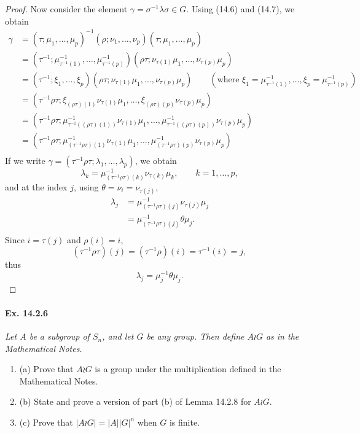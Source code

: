 \documentclass[11pt,a4paper]{article}
\newcommand{\be} {\begin{enumerate}}
\newcommand{\ee} {\end{enumerate}}
\begin{document}
\begin{proof}
Now consider the element $\gamma = \sigma^{-1} \lambda \sigma \in G$. Using (14.6) and (14.7), we obtain
\begin{align*}
\gamma &=  (\tau; \mu_1,\ldots,\mu_p)^{-1} (\rho; \nu_1,\ldots,\nu_p)(\tau; \mu_1,\ldots,\mu_p)\\
&=(\tau^{-1};\mu^{-1}_{\tau^{-1}(1)},\ldots,\mu^{-1}_{\tau^{-1}(p) })(\rho \tau; \nu_{\tau(1)}\mu_1,\ldots,\nu_{\tau(p)} \mu_p)\\
&=(\tau^{-1};\xi_1,\ldots,\xi_p)(\rho \tau; \nu_{\tau(1)}\mu_1,\ldots,\nu_{\tau(p)} \mu_p)\qquad (\text{where }\xi_1 =\mu^{-1}_{\tau^{-1}(1)},\ldots, \xi_p =\mu^{-1}_{\tau^{-1}(p)}) \\
&= (\tau^{-1} \rho \tau; \xi_{(\rho \tau)(1)}\nu_{\tau(1)}\mu_1,\ldots,\xi_{(\rho \tau)(p)}\nu_{\tau(p)}\mu_p)\\
&= (\tau^{-1} \rho \tau; \mu^{-1}_{\tau^{-1}((\rho \tau)(1))}\nu_{\tau(1)}\mu_1,\ldots,\mu^{-1}_{\tau^{-1}((\rho \tau)(p))}\nu_{\tau(p)}\mu_p)\\
&=(\tau^{-1} \rho \tau; \mu^{-1}_{(\tau^{-1}\rho \tau)(1)}\nu_{\tau(1)}\mu_1,\ldots,\mu^{-1}_{(\tau^{-1}\rho \tau)(p)}\nu_{\tau(p)}\mu_p)\\
\end{align*}
If we write $\gamma = (\tau^{-1} \rho \tau; \lambda_1,\ldots,\lambda_p)$, we obtain
$$\lambda_k = \mu^{-1}_{(\tau^{-1}\rho \tau)(k)}\nu_{\tau(k)}\mu_k,\qquad k = 1,\ldots,p,$$
and at the index $j$, using $\theta = \nu_i = \nu_{\tau(j)}$,
\begin{align*}
\lambda_j &= \mu^{-1}_{(\tau^{-1}\rho \tau)(j)}\nu_{\tau(j)}\mu_j\\
&=\mu^{-1}_{(\tau^{-1}\rho \tau)(j)}\theta\mu_j.\\
\end{align*}
Since $i = \tau(j)$ and $\rho(i) = i$, 
$$(\tau^{-1} \rho\tau)(j) = (\tau^{-1} \rho)(i) = \tau^{-1} (i) = j,$$
thus
$$\lambda_j = \mu_j^{-1} \theta \mu_j.$$
\end{proof}



\paragraph{Ex. 14.2.6}
{\it Let $A$ be a subgroup of $S_n$, and let $G$ be any group. Then define $A \wr G$ as in the Mathematical Notes.
\be
\item[(a)] Prove that $A \wr G$ is a group under the multiplication defined in the Mathematical Notes.
\item[(b)] State and prove a version of part (b) of Lemma 14.2.8 for $A \wr G$.
\item[(c)] Prove that $|A \wr G | = |A| |G|^n$ when $G$ is finite.
\ee
}
\end{document}
